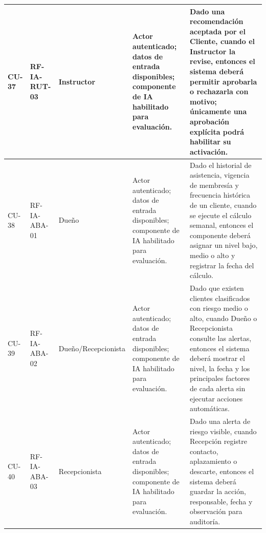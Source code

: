 \begin{landscape}
\begin{longtable}{|p{1.2cm}|p{1.9cm}|p{2.4cm}|p{5.0cm}|p{9.2cm}|}
CU-37 & RF-IA-RUT-03 & Instructor & Actor autenticado; datos de entrada disponibles; componente de IA habilitado para evaluación. & Dado una recomendación aceptada por el Cliente, cuando el Instructor la revise, entonces el sistema deberá permitir aprobarla o rechazarla con motivo; únicamente una aprobación explícita podrá habilitar su activación. \\ \hline
CU-38 & RF-IA-ABA-01 & Dueño & Actor autenticado; datos de entrada disponibles; componente de IA habilitado para evaluación. & Dado el historial de asistencia, vigencia de membresía y frecuencia histórica de un cliente, cuando se ejecute el cálculo semanal, entonces el componente deberá asignar un nivel bajo, medio o alto y registrar la fecha del cálculo. \\ \hline
CU-39 & RF-IA-ABA-02 & Dueño/Recepcionista & Actor autenticado; datos de entrada disponibles; componente de IA habilitado para evaluación. & Dado que existen clientes clasificados con riesgo medio o alto, cuando Dueño o Recepcionista consulte las alertas, entonces el sistema deberá mostrar el nivel, la fecha y los principales factores de cada alerta sin ejecutar acciones automáticas. \\ \hline
CU-40 & RF-IA-ABA-03 & Recepcionista & Actor autenticado; datos de entrada disponibles; componente de IA habilitado para evaluación. & Dado una alerta de riesgo visible, cuando Recepción registre contacto, aplazamiento o descarte, entonces el sistema deberá guardar la acción, responsable, fecha y observación para auditoría. \\ \hline
\end{longtable}
\normalsize
\end{landscape}
